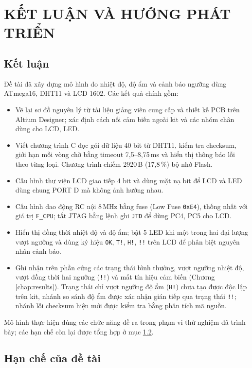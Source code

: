 \chapter{KẾT LUẬN VÀ HƯỚNG PHÁT TRIỂN}

\section{Kết luận}

Đề tài đã xây dựng mô hình đo nhiệt độ, độ ẩm và cảnh báo ngưỡng dùng ATmega16, DHT11 và LCD 1602. Các kết quả chính gồm:
\begin{itemize}[leftmargin=1.2cm]
    \item Vẽ lại sơ đồ nguyên lý từ tài liệu giảng viên cung cấp và thiết kế PCB trên Altium Designer; xác định cách nối cảm biến ngoài kit và các nhóm chân dùng cho LCD, LED.
    \item Viết chương trình C đọc gói dữ liệu 40 bit từ DHT11, kiểm tra checksum, giới hạn mỗi vòng chờ bằng timeout 7,5--8,75\,ms và hiển thị thông báo lỗi theo từng loại. Chương trình chiếm 2920\,B (17,8\,\%) bộ nhớ Flash.
    \item Cấu hình thư viện LCD giao tiếp 4 bit và dùng mặt nạ bit để LCD và LED dùng chung PORT D mà không ảnh hưởng nhau.
    \item Cấu hình dao động RC nội 8\,MHz bằng fuse (Low Fuse \texttt{0xE4}), thống nhất với giá trị \texttt{F\_CPU}; tắt JTAG bằng lệnh ghi \texttt{JTD} để dùng PC4, PC5 cho LCD.
    \item Hiển thị đồng thời nhiệt độ và độ ẩm; bật 5 LED khi một trong hai đại lượng vượt ngưỡng và dùng ký hiệu \texttt{OK}, \texttt{T!}, \texttt{H!}, \texttt{!!} trên LCD để phân biệt nguyên nhân cảnh báo.
    \item Ghi nhận trên phần cứng các trạng thái bình thường, vượt ngưỡng nhiệt độ, vượt đồng thời hai ngưỡng (\texttt{!!}) và mất tín hiệu cảm biến (Chương \ref{chap:results}). Trạng thái chỉ vượt ngưỡng độ ẩm (\texttt{H!}) chưa tạo được độc lập trên kit, nhánh so sánh độ ẩm được xác nhận gián tiếp qua trạng thái \texttt{!!}; nhánh lỗi checksum hiện mới được kiểm tra bằng phân tích mã nguồn.
\end{itemize}
Mô hình thực hiện đúng các chức năng đề ra trong phạm vi thử nghiệm đã trình bày; các hạn chế còn lại được tổng hợp ở mục \ref{sec:conclusion-limits}.

\section{Hạn chế của đề tài}
\label{sec:conclusion-limits}

